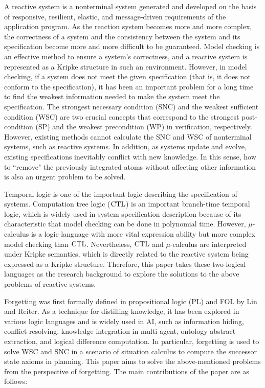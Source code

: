 \begin{englishabstract}
A reactive system is a nonterminal system generated and developed on the basis of responsive, resilient, elastic, and message-driven requirements of the application program.  As the reaction system becomes more and more complex, the correctness of a system and the consistency between the system and its specification become more and more difficult to be guaranteed. 	
Model checking is an effective method to ensure a system's correctness, and a reactive system is represented as a Kripke structure in such an environment.  However, in model checking, if a system does not meet the given specification (that is, it does not conform to the specification), it has been an important problem for a long time to find the weakest information needed to make the system meet the specification.
The strongest necessary condition (SNC) and the weakest sufficient condition (WSC)  are two crucial concepts that correspond to the strongest post-condition (SP) and the weakest precondition (WP) in verification, respectively. However, existing methods cannot calculate the SNC and WSC of nonterminal systems, such as reactive systems.
In addition, as systems update and evolve, existing specifications inevitably conflict with new knowledge. In this sense, how to ``remove" the previously integrated atoms without affecting other information is also an urgent problem to be solved.
	
	
Temporal logic is one of the important logic describing the specification of systems.   Computation tree logic ($\textrm{CTL}$) is an important branch-time temporal logic, which is widely used in system specification description because of its characteristic that model checking can be done in polynomial time.  However, $\mu$-calculus is a logic language with more vital expression ability but more complex model checking than $\textrm{CTL}$.
Nevertheless, $\textrm{CTL}$ and $\mu$-calculus are interpreted under Kripke semantics, which is directly related to the reactive system being expressed as a Kripke structure.
Therefore, this paper takes these two logical languages as the research background to explore the solutions to the above problems of reactive systems.


Forgetting was first formally defined in propositional logic (PL) and FOL by Lin and Reiter. As a technique for distilling knowledge, it has been explored in various logic languages and is widely used in AI, such as information hiding, conflict resolving, knowledge integration in multi-agent, ontology abstract extraction, and logical difference computation. In particular, forgetting is used to solve WSC and SNC in a scenario of situation calculus to compute the successor state axioms in planning. This paper aims to solve the above-mentioned problems from the perspective of forgetting. The main contributions of the paper are as follows:



\end{englishabstract}

